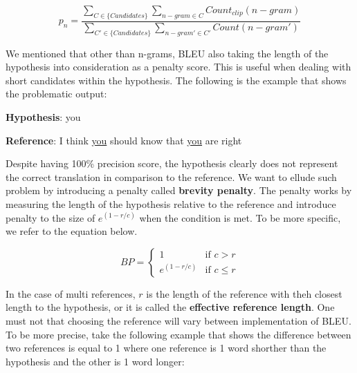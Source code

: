 \begin{equation}
    p_n=\frac{\sum_{C\in\{Candidates\}}\sum_{n-gram\in C}Count_{clip}(n-gram)}{\sum_{C'\in\{Candidates\}}\sum_{n-gram'\in C'}Count(n-gram')}
\end{equation}

We mentioned that other than n-grams, BLEU also taking the length of the hypothesis into consideration as a penalty score. This is useful when dealing with short candidates within the hypothesis. The following is the example that shows the problematic output:

\bigskip

\textbf{Hypothesis}: you

\textbf{Reference}: I think \underline{you} should know that \underline{you} are right

\bigskip

Despite having 100\% precision score, the hypothesis clearly does not represent the correct translation in comparison to the reference. We want to ellude such problem by introducing a penalty called \textbf{brevity penalty}. The penalty works by measuring the length of the hypothesis relative to the reference and introduce penalty to the size of $e^{(1-r/c)}$ when the condition is met. To be more specific, we refer to the equation below.

\begin{equation}
    BP=\begin{cases} 1 & \mbox{if } c>r \\ e^{(1-r/c)} & \mbox{if } c\le r \end{cases}
\end{equation}

In the case of multi references, $r$ is the length of the reference with theh closest length to the hypothesis, or it is called the \textbf{effective reference length}. One must not that choosing the reference will vary between implementation of BLEU. To be more precise, take the following example that shows the difference between two references is equal to 1 where one reference is 1 word shorther than the hypothesis and the other is 1 word longer:

